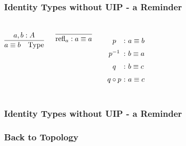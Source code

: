\documentclass[12pt,pdflatex,hyperref={pdfstartview=Fit,bookmarks=true,bookmarksopen=true,pdfpagemode=None,colorlinks=true,linkcolor=unserblau,urlcolor=unserblau},notes=hide,t,handout]{beamer}
\begin{document}
\begin{frame}

\frametitle{Identity Types without UIP - a Reminder}

\begin{columns}[c] %


\vspace{30pt}

\[
\infer{a \equiv b \quad \mbox{Type}}{a, b : A}
\]

\vspace{30pt}

\[
\infer{\mbox{refl}_a : a \equiv a}{}
\]



\vspace{30pt}

\[
\begin{array}{c@{ \ : \ }l}
\noalign{\medskip}
p & a \equiv b \\
\noalign{\medskip}

p^{-1} & b \equiv a \\
\noalign{\medskip}

q & b \equiv c \\
\noalign{\medskip}

q \circ p & a \equiv c \\
\end{array}
\]

\end{columns}

\end{frame}


\begin{frame}

\frametitle{Identity Types without UIP - a Reminder}


\end{frame}


\begin{frame}
\frametitle{Back to Topology}

\end{frame}
\end{document}
